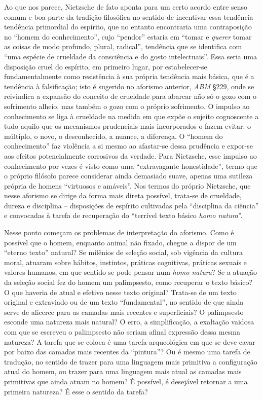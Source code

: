 \documentclass[
	12pt,				%
	openright,			%
	oneside,			%
	a4paper,			%
	english,			%
	french,				%
	spanish,			%
	brazil				%
	]{abntex2}
\begin{document}
Ao que nos parece, Nietzsche de fato aponta para um certo acordo entre senso comum e boa parte da tradição filosófica no sentido de incentivar essa tendência tendência primordial do espírito, que no entanto encontraria uma contraposição no “homem do conhecimento”, cujo “pendor” estaria em “tomar e \textit{querer} tomar as coisas de modo profundo, plural, radical”, tendência que se identifica com “uma espécie de crueldade da consciência e do gosto intelectuais”. Essa seria uma disposição cruel do espírito, em primeiro lugar, por estabelecer-se fundamentalmente como resistência à sua própria tendência mais básica, que é a tendência à falsificação; isto é sugerido no aforismo anterior, \textit{ABM} §229, onde se reivindica a expansão do conceito de crueldade para abarcar não só o gozo com o sofrimento alheio, mas também o gozo com o próprio sofrimento. O impulso ao conhecimento se liga à crueldade na medida em que expõe o sujeito cognoscente a tudo aquilo que os mecanismos prudenciais mais incorporados o fazem evitar: o múltiplo, o novo, o desconhecido, a nuance, a diferença. O “homem do conhecimento” faz violência a si mesmo ao afastar-se dessa prudência e expor-se aos efeitos potencialmente corrosivos da verdade. Para Nietzsche, esse impulso ao conhecimento por vezes é visto como uma “extravagante honestidade”, termo que o próprio filósofo parece considerar ainda demasiado suave, apenas uma sutileza própria de homens “virtuosos e amáveis”. Nos termos do próprio Nietzsche, que nesse aforismo se dirige da forma mais direta possível, trata-se de crueldade, dureza e disciplina – disposições de espírito cultivadas pela “disciplina da ciência” e convocadas à tarefa de recuperação do “terrível texto básico \textit{homo natura}”. 

Nesse ponto começam os problemas de interpretação do aforismo. Como é possível que o homem, enquanto animal não fixado, chegue a dispor de um “eterno texto” natural? Se milênios de seleção social, sob vigência da cultura moral, atuaram sobre hábitos, instintos, práticas cognitivas, práticas sexuais e valores humanos, em que sentido se pode pensar num \textit{homo natura}? Se a atuação da seleção social fez do homem um palimpsesto, como recuperar o texto básico? O que haveria de atual e efetivo nesse texto original? Trata-se de um texto original e extraviado ou de um texto “fundamental”, no sentido de que ainda serve de alicerce para as camadas mais recentes e superficiais? O palimpsesto esconde uma natureza mais natural? O erro, a simplificação, a exaltação vaidosa com que se escreveu o palimpsesto não seriam afinal expressão dessa mesma natureza? A tarefa que se coloca é uma tarefa arqueológica em que se deve cavar por baixo das camadas mais recentes da “pintura”? Ou é mesmo uma tarefa de tradução, no sentido de trazer para uma linguagem mais primitiva a configuração atual do homem, ou trazer para uma linguagem mais atual as camadas mais primitivas que ainda atuam no homem? É possível, é desejável retornar a uma primeira natureza? É esse o sentido da tarefa?
\end{document}
